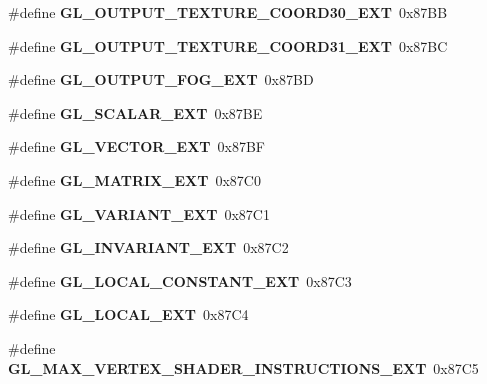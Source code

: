 \begin{DoxyCompactItemize}
\item 
\#define {\bfseries G\+L\+\_\+\+O\+U\+T\+P\+U\+T\+\_\+\+T\+E\+X\+T\+U\+R\+E\+\_\+\+C\+O\+O\+R\+D30\+\_\+\+E\+X\+T}~0x87\+B\+B\label{_s_d_l__opengl_8h_ad98881797ab3f740d8f4666aee93eab1}

\item 
\#define {\bfseries G\+L\+\_\+\+O\+U\+T\+P\+U\+T\+\_\+\+T\+E\+X\+T\+U\+R\+E\+\_\+\+C\+O\+O\+R\+D31\+\_\+\+E\+X\+T}~0x87\+B\+C\label{_s_d_l__opengl_8h_a657c8015b20efb7048d373e774be2ffb}

\item 
\#define {\bfseries G\+L\+\_\+\+O\+U\+T\+P\+U\+T\+\_\+\+F\+O\+G\+\_\+\+E\+X\+T}~0x87\+B\+D\label{_s_d_l__opengl_8h_a5bcabeb1b631fa5ac301cfc0a611539b}

\item 
\#define {\bfseries G\+L\+\_\+\+S\+C\+A\+L\+A\+R\+\_\+\+E\+X\+T}~0x87\+B\+E\label{_s_d_l__opengl_8h_addaa0b88bf7fac85d87ef920e4f6d0c3}

\item 
\#define {\bfseries G\+L\+\_\+\+V\+E\+C\+T\+O\+R\+\_\+\+E\+X\+T}~0x87\+B\+F\label{_s_d_l__opengl_8h_a2a13d4c2924997fbe711dcd228b0f6fb}

\item 
\#define {\bfseries G\+L\+\_\+\+M\+A\+T\+R\+I\+X\+\_\+\+E\+X\+T}~0x87\+C0\label{_s_d_l__opengl_8h_a1ec9ac9e3db7f86f698cab975a9808ba}

\item 
\#define {\bfseries G\+L\+\_\+\+V\+A\+R\+I\+A\+N\+T\+\_\+\+E\+X\+T}~0x87\+C1\label{_s_d_l__opengl_8h_ab1c2deb45740e0fffc4eef0fc651e459}

\item 
\#define {\bfseries G\+L\+\_\+\+I\+N\+V\+A\+R\+I\+A\+N\+T\+\_\+\+E\+X\+T}~0x87\+C2\label{_s_d_l__opengl_8h_a751576246ae7972b0341e94d8cd85b36}

\item 
\#define {\bfseries G\+L\+\_\+\+L\+O\+C\+A\+L\+\_\+\+C\+O\+N\+S\+T\+A\+N\+T\+\_\+\+E\+X\+T}~0x87\+C3\label{_s_d_l__opengl_8h_aabfae267fd32e344bcfe1934bf9f2d2d}

\item 
\#define {\bfseries G\+L\+\_\+\+L\+O\+C\+A\+L\+\_\+\+E\+X\+T}~0x87\+C4\label{_s_d_l__opengl_8h_af3a372d5e93d651411a7df0a7809d2e8}

\item 
\#define {\bfseries G\+L\+\_\+\+M\+A\+X\+\_\+\+V\+E\+R\+T\+E\+X\+\_\+\+S\+H\+A\+D\+E\+R\+\_\+\+I\+N\+S\+T\+R\+U\+C\+T\+I\+O\+N\+S\+\_\+\+E\+X\+T}~0x87\+C5\label{_s_d_l__opengl_8h_a41606dbc92b003086f516d93f664fe89}


\end{DoxyCompactItemize}
